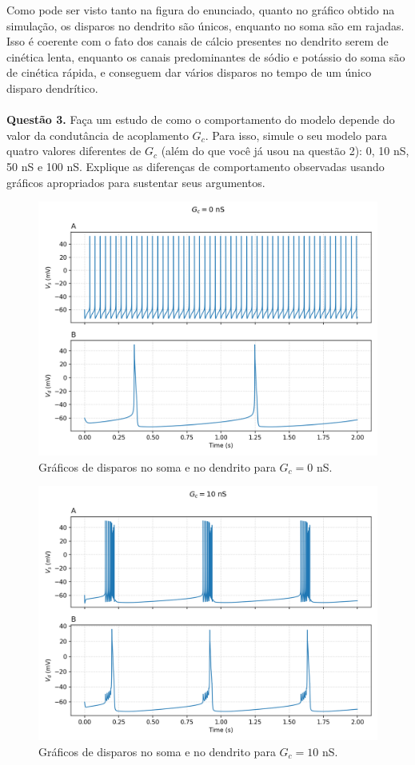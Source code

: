 \documentclass[english,11pt,a4paper]{article}
\begin{document}
	Como pode ser visto tanto na figura do enunciado, quanto no gráfico obtido na simulação, os disparos no dendrito são únicos, enquanto no soma são em rajadas. Isso é coerente com o fato dos canais de cálcio presentes no dendrito serem de cinética lenta, enquanto os canais predominantes de sódio e potássio do soma são de cinética rápida, e conseguem dar vários disparos no tempo de um único disparo dendrítico.\\\\
	

	
	\noindent \textbf{Questão 3.} Faça um estudo de como o comportamento do modelo depende do valor da condutância de acoplamento \(G_c\). Para isso, simule o seu modelo para quatro valores diferentes de \(G_c\) (além do que você já usou na questão 2): 0, 10 nS, 50 nS e 100 nS. Explique as diferenças de comportamento observadas usando gráficos apropriados para sustentar seus argumentos.
	
	\begin{figure}[H]
		\centering
		\includegraphics[width=12cm]{../figures/ex_3_gc0.png}
		\caption{Gráficos de disparos no soma e no dendrito para $G_c = 0$ nS.}
	\end{figure}
	
	\begin{figure}[H]
		\centering
		\includegraphics[width=12cm]{../figures/ex_3_gc10.png}
		\caption{Gráficos de disparos no soma e no dendrito para $G_c = 10$ nS.}
	\end{figure}
	
\end{document}
